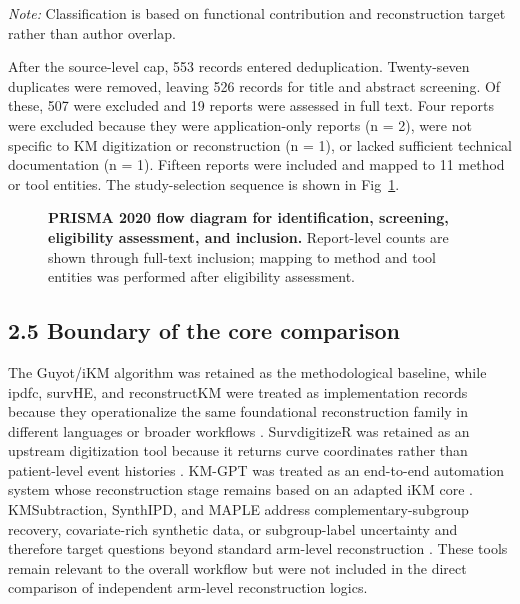 \documentclass[10pt,letterpaper]{article}
\newif\ifshowfigures
\begin{document}
\emph{Note:} Classification is based on functional contribution and reconstruction target rather than author overlap.

After the source-level cap, 553 records entered deduplication. Twenty-seven duplicates were removed, leaving 526 records for title and abstract screening. Of these, 507 were excluded and 19 reports were assessed in full text. Four reports were excluded because they were application-only reports (n = 2), were not specific to KM digitization or reconstruction (n = 1), or lacked sufficient technical documentation (n = 1). Fifteen reports were included and mapped to 11 method or tool entities. The study-selection sequence is shown in Fig~\ref{fig:prisma}.

\begin{figure}[!ht]
\centering
\ifshowfigures
\fbox{\parbox[c][2.0in][c]{0.92\textwidth}{\centering\textbf{Draft placeholder: Fig 1}\\[4pt]Replace this box with the final PRISMA 2020 flow diagram after the screening ledger is audited.}}
\fi
\caption{\textbf{PRISMA 2020 flow diagram for identification, screening, eligibility assessment, and inclusion.} Report-level counts are shown through full-text inclusion; mapping to method and tool entities was performed after eligibility assessment.}
\label{fig:prisma}
\end{figure}

\subsection*{2.5 Boundary of the core comparison}

The Guyot/iKM algorithm was retained as the methodological baseline, while ipdfc, survHE, and reconstructKM were treated as implementation records because they operationalize the same foundational reconstruction family in different languages or broader workflows \cite{guyot2012,wei2017,baio2020,reconstructkm2025}. SurvdigitizeR was retained as an upstream digitization tool because it returns curve coordinates rather than patient-level event histories \cite{zhang2024}. KM-GPT was treated as an end-to-end automation system whose reconstruction stage remains based on an adapted iKM core \cite{kmgpt2025}. KMSubtraction, SynthIPD, and MAPLE address complementary-subgroup recovery, covariate-rich synthetic data, or subgroup-label uncertainty and therefore target questions beyond standard arm-level reconstruction \cite{zhao2022,synthipd2026,resolve2026}. These tools remain relevant to the overall workflow but were not included in the direct comparison of independent arm-level reconstruction logics.
\end{document}
